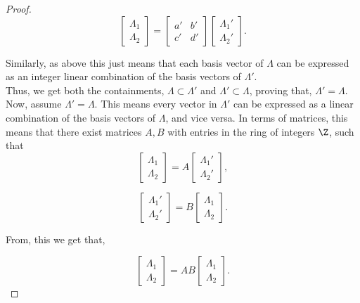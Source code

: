\begin{lemma}
\begin{proof}
\[ \left[\begin{array}{c} \Lambda_1 \\ \Lambda_2 \end{array}\right] = \left[\begin{array}{cc} a' & b' \\ c' & d' \end{array}\right] \left[\begin{array}{c} \Lambda_1' \\ \Lambda_2' \end{array}\right]. \]

Similarly, as above this just means that each basis vector of \(\Lambda\) can be expressed as an integer linear combination of the basis vectors of \(\Lambda'\). \\
Thus, we get both the containments, $\Lambda \subset \Lambda'$ and $\Lambda' \subset \Lambda$, proving that, \(\Lambda' = \Lambda\).\\

Now, assume \(\Lambda' = \Lambda\). This means every vector in \(\Lambda'\) can be expressed as a linear combination of the basis vectors of \(\Lambda\), and vice versa. In terms of matrices, this means that there exist matrices $A,B$ with entries in the ring of integers $\Z$, such that \[ \left[\begin{array}{c} \Lambda_1 \\ \Lambda_2 \end{array}\right] = A \left[\begin{array}{c} \Lambda_1' \\ \Lambda_2' \end{array}\right], \]

\[ \left[\begin{array}{c} \Lambda_1' \\ \Lambda_2' \end{array}\right] = B\left[\begin{array}{c} \Lambda_1 \\ \Lambda_2 \end{array}\right]. \]

From, this we get that, 

\[ \left[\begin{array}{c} \Lambda_1 \\ \Lambda_2 \end{array}\right] = AB \left[\begin{array}{c} \Lambda_1\\ \Lambda_2 \end{array}\right]. \]


\end{proof}
\end{lemma}
